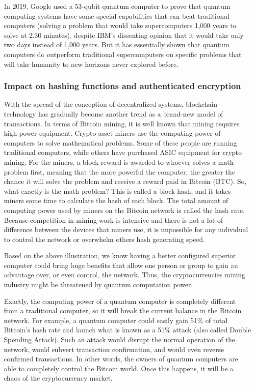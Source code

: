 \documentclass[sigconf]{acmart}
\begin{document}
In 2019, Google used a 53-qubit quantum computer to prove that quantum computing systems have some special capabilities that can beat traditional computers (solving a problem that would take supercomputers 1,000 years to solve at 2.30 minutes), despite IBM's dissenting opinion that it would take only two days instead of 1,000 years. But it has essentially shown that quantum computers do outperform traditional supercomputers on specific problems that will take humanity to new horizons never explored before.\cite{arute_quantum_2019}

\subsubsection{Impact on hashing functions and authenticated encryption}
With the spread of the conception of decentralized systems, blockchain technology has gradually become another trend as a brand-new model of transactions. In terms of Bitcoin mining, it is well known that mining requires high-power equipment. Crypto asset miners use the computing power of computers to solve mathematical problems. Some of these people are running traditional computers, while others have purchased ASIC equipment for crypto mining. For the miners, a block reward is awarded to whoever solves a math problem first, meaning that the more powerful the computer, the greater the chance it will solve the problem and receive a reward paid in Bitcoin (BTC). So, what exactly is the math problem? This is called a block hash, and it takes miners some time to calculate the hash of each block. The total amount of computing power used by miners on the Bitcoin network is called the hash rate. Because competition in mining work is intensive and there is not a lot of difference between the devices that miners use, it is impossible for any individual to control the network or overwhelm others hash generating speed.

Based on the above illustration, we know having a better configured superior computer could bring huge benefits that allow one person or group to gain an advantage over, or even control, the network. Thus, the cryptocurrencies mining industry might be threatened by quantum computation power.

Exactly, the computing power of a quantum computer is completely different from a traditional computer, so it will break the current balance in the Bitcoin network. For example, a quantum computer could easily gain 51\% of total Bitcoin's hash rate and launch what is known as a 51\% attack (also called Double Spending Attack). Such an attack would disrupt the normal operation of the network, would subvert transaction confirmation, and would even reverse confirmed transactions. In other words, the owners of quantum computers are able to completely control the Bitcoin world. Once this happens, it will be a chaos of the cryptocurrency market. 
\end{document}
